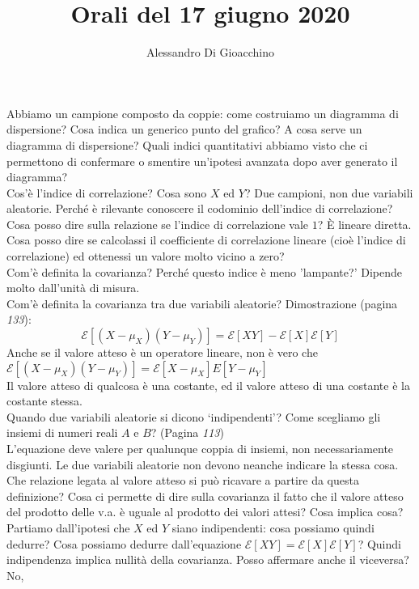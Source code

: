 \documentclass{article}
\title{Orali del 17 giugno 2020}
\author{Alessandro Di Gioacchino}
\newcommand{\ii}{\textit}
\begin{document}
    \maketitle

    Abbiamo un campione composto da coppie: come costruiamo un diagramma di dispersione? Cosa indica un generico punto del grafico? A cosa serve un diagramma di dispersione? Quali
    indici quantitativi abbiamo visto che ci permettono di confermare o smentire un'ipotesi avanzata dopo aver generato il diagramma? \\
    Cos'è l'indice di correlazione? Cosa sono $ X $ ed $ Y $? Due campioni, non due variabili aleatorie. Perché è rilevante conoscere il codominio dell'indice di correlazione?
    Cosa posso dire sulla relazione se l'indice di correlazione vale $ 1 $? È lineare diretta. Cosa posso dire se calcolassi il coefficiente di correlazione lineare (cioè l'indice
    di correlazione) ed ottenessi un valore molto vicino a zero? \\
    Com'è definita la covarianza? Perché questo indice è meno 'lampante?' Dipende molto dall'unità di misura. \\
    Com'è definita la covarianza tra due variabili aleatorie? Dimostrazione (pagina \ii{133}):
    \[
        \mathcal E [ ( X - \mu_X ) ( Y - \mu_Y ) ] = \mathcal E [ X Y ] - \mathcal E [ X ] \mathcal E [ Y ]
    \]
    Anche se il valore atteso è un operatore lineare, non è vero che $ \mathcal E [ ( X - \mu_X ) ( Y - \mu_Y ) ] = \mathcal E [ X - \mu_X ] E [ Y - \mu_Y ] $ \\
    Il valore atteso di qualcosa è una costante, ed il valore atteso di una costante è la costante stessa. \\
    Quando due variabili aleatorie si dicono ‘indipendenti’? Come scegliamo gli insiemi di numeri reali $ A $ e $ B $? (Pagina \ii{113}) \\
    L'equazione deve valere per qualunque coppia di insiemi, non necessariamente disgiunti. Le due variabili aleatorie non devono neanche indicare la stessa cosa. Che relazione
    legata al valore atteso si può ricavare a partire da questa definizione? Cosa ci permette di dire sulla covarianza il fatto che il valore atteso del prodotto delle v.a. è
    uguale al prodotto dei valori attesi? Cosa implica cosa? Partiamo dall'ipotesi che $ X $ ed $ Y $ siano indipendenti: cosa possiamo quindi dedurre? Cosa possiamo dedurre
    dall'equazione $ \mathcal E [ X Y ] = \mathcal E [ X ] \mathcal E [ Y ] $? Quindi indipendenza implica nullità della covarianza. Posso affermare anche il viceversa? No, 
\end{document}

